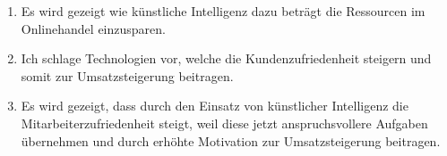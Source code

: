 \begin{enumerate}[label=(\arabic*)]
	\item Es wird gezeigt wie künstliche Intelligenz dazu beträgt die Ressourcen im Onlinehandel einzusparen.
	\item Ich schlage Technologien vor, welche die Kundenzufriedenheit steigern und somit zur Umsatzsteigerung beitragen.
	\item Es wird gezeigt, dass durch den Einsatz von künstlicher Intelligenz die Mitarbeiterzufriedenheit steigt, weil diese jetzt anspruchsvollere Aufgaben übernehmen und durch erhöhte Motivation zur Umsatzsteigerung beitragen.
\end{enumerate}